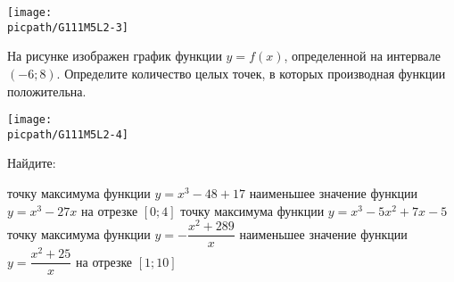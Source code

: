 \begin{class}[number=2]
\begin{listofex}
\begin{minipage}[t]{\picwidth}
			\texttt{[image: \\picpath/G111M5L2-3]}
		\end{minipage}
		\item
		\begin{minipage}[t]{\bodywidth}
			На рисунке изображен график функции \(y = f(x)\), определенной на интервале \((-6; 8)\). Определите количество целых точек, в которых производная функции положительна.
		\end{minipage}
		\hspace{0.02\linewidth}
		\begin{minipage}[t]{\picwidth}
			\texttt{[image: \\picpath/G111M5L2-4]}
		\end{minipage}
		\item Найдите:
		\begin{itasks}[1]
			\task точку максимума функции \(y = x^3 - 48 + 17\)
			\task наименьшее значение функции \(y = x^3 - 27x\) на отрезке \([0;4]\)
			\task точку максимума функции \(y = x^3 - 5x^2 + 7x -5\)
			\task точку максимума функции \(y = -\dfrac{x^2+289}{x}\)
			\task наименьшее значение функции \(y = \dfrac{x^2+25}{x}\) на отрезке \([1;10]\)
		\end{itasks}
	\end{listofex}
\end{class}

